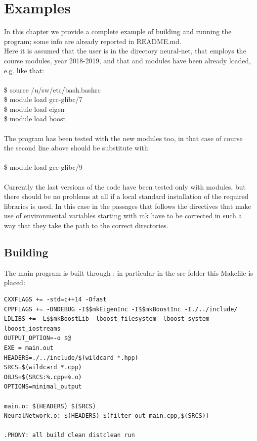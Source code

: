 \documentclass[12pt, a4paper]{report}
\theoremstyle{definition}
\begin{document}
{\chapter{Examples}\label{chapter4}
In this chapter we provide a complete example of building and running the program; some info are already reported in README.md.\\
Here it is assumed that the user is in the directory neural-net, that employs the \cite{pacs} course modules, year 2018-2019, and that \cite{eigen} and \cite{boost} modules have been already loaded, e.g. like that:\\
{\\ \ttfamily 
	\$ source /u/sw/etc/bash.bashrc\\
	\$ module load gcc-glibc/7\\
	\$ module load eigen\\
	\$ module load boost\\
	\\}
The program has been tested with the new modules too, in that case of course the second line above should be substitute with:\\
{\\ \ttfamily 
	\$ module load gcc-glibc/9\\
	\\}
Currently the last versions of the code have been tested only with modules, but there should be no problems at all if a local standard installation of the required libraries is used. In this case in the passages that follows the directives that make use of environmental variables starting with {\ttfamily mk} have to be corrected in such a way that they take the path to the correct directories.
\newpage
\section{Building}
The main program is built through \cite{make}; in particular in the src folder this Makefile is placed:
\begin{lstlisting}[frame=single]
CXXFLAGS += -std=c++14 -Ofast
CPPFLAGS += -DNDEBUG -I$$mkEigenInc -I$$mkBoostInc -I./../include/
LDLIBS += -L$$mkBoostLib -lboost_filesystem -lboost_system -lboost_iostreams
OUTPUT_OPTION=-o $@
EXE = main.out
HEADERS=./../include/$(wildcard *.hpp)
SRCS=$(wildcard *.cpp)
OBJS=$(SRCS:%.cpp=%.o)
OPTIONS=minimal_output

main.o: $(HEADERS) $(SRCS)
NeuralNetwork.o: $(HEADERS) $(filter-out main.cpp,$(SRCS))

.PHONY: all build clean distclean run


\end{lstlisting}}
\end{document}
